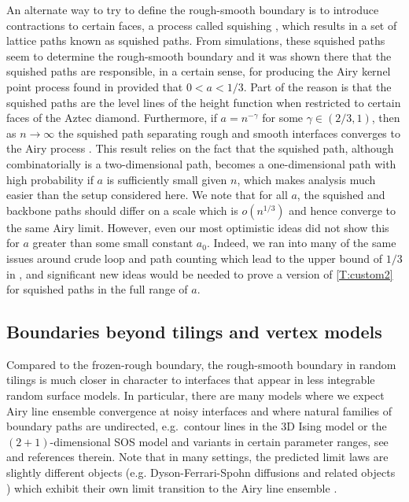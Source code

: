 \documentclass[11pt,twoside]{amsart}
\theoremstyle{plain}
\numberwithin{quest}{section}
\theoremstyle{remark}
\numberwithin{rem}{section}
\theoremstyle{definition}
\begin{document}
	An alternate way to try to define the rough-smooth boundary is to introduce contractions to certain faces, a process called squishing \cite{BCJ22}, which results in a set of lattice paths known as squished paths.  From simulations, these squished paths seem to determine the rough-smooth boundary and it was shown there that the squished paths are responsible, in a certain sense, for producing the Airy kernel point process found in \cite{BCJ18} provided that $0<a<1/3$.   
    Part of the reason is that the squished paths are the level lines of the height function when restricted to certain faces of the Aztec diamond.  Furthermore, if $a = n^{-\gamma}$ for some $\gamma \in (2/3, 1)$, then  as $n \to \infty$ the squished path separating rough and smooth interfaces converges to the Airy process \cite{JM23}.  This result relies on the fact that the squished path, although combinatorially is a two-dimensional path, becomes a one-dimensional path with high probability if $a$ is sufficiently small given $n$, which makes analysis much easier than the setup considered here. We note that for all $a$, the squished and backbone paths should differ on a scale which is $o(n^{1/3})$ and hence converge to the same Airy limit. However, even our most optimistic ideas did not show this for $a$ greater than some small constant $a_0$. Indeed, we ran into many of the same issues around crude loop and path counting which lead to the upper bound of $1/3$ in \cite{BCJ22}, and significant new ideas would be needed to prove a version of \cref{T:custom2} for squished paths in the full range of $a$.


\subsection{Boundaries beyond tilings and vertex models}
\label{S:beyond-tilings}
Compared to the frozen-rough boundary, the rough-smooth boundary in random tilings is much closer in character to interfaces that appear in less integrable random surface models. In particular, there are many models where we expect Airy line ensemble convergence at noisy interfaces and where natural families of boundary paths are undirected, e.g.\ contour lines in the 3D Ising model or the $(2+1)$-dimensional SOS model and variants in certain parameter ranges, see \cite{ioffe2015interaction, ioffe2016low,  ferrari2023airy2} and references therein. Note that in many settings, the predicted limit laws are slightly different objects 
(e.g. Dyson-Ferrari-Spohn diffusions and related objects \cite{ioffe2018dyson, basu2025characterizing}) which exhibit their own limit transition to the Airy line ensemble \cite{ferrari2023airy2, dimitrov2025uniform}.
\end{document}

